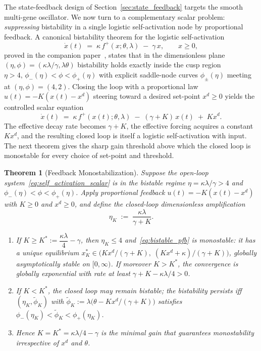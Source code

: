 \documentclass[12pt]{article}
\newtheorem{theorem}{Theorem}
\newcommand{\fplus}{f^{+}}
\begin{document}
The state-feedback design of Section~\ref{sec:state_feedback} targets
the smooth multi-gene oscillator. We now turn to a complementary
scalar problem: \emph{suppressing} bistability in a single logistic
self-activation node by proportional feedback. A canonical bistability
theorem for the logistic self-activation
\begin{equation}
\dot x(t) \;=\; \kappa\,\fplus(x;\theta,\lambda) \;-\; \gamma\,x,
\qquad x\ge 0,
\label{eq:self_activation_scalar}
\end{equation}
proved in the companion paper~\cite{belgacem2026extensions}, states
that in the dimensionless plane
$(\eta,\phi)=(\kappa\lambda/\gamma,\lambda\theta)$ bistability holds
exactly inside the cusp region $\eta>4,\,\phi_{-}(\eta)<\phi<\phi_{+}(\eta)$
with explicit saddle-node curves $\phi_{\pm}(\eta)$ meeting at
$(\eta,\phi)=(4,2)$. Closing the loop with a proportional law
$u(t)=-K(x(t)-x^{d})$ steering toward a desired set-point $x^{d}\ge 0$
yields the controlled scalar equation
\begin{equation}
\dot x(t) \;=\; \kappa\,\fplus(x(t);\theta,\lambda)
              \;-\;(\gamma+K)\,x(t)\;+\;K x^{d}.
\label{eq:bistable_pfb}
\end{equation}
The effective decay rate becomes $\gamma+K$, the effective forcing
acquires a constant $Kx^{d}$, and the resulting closed loop is itself
a logistic self-activation with input. The next theorem gives the
sharp gain threshold above which the closed loop is monostable for
every choice of set-point and threshold.

\begin{theorem}[Feedback Monostabilization]
\label{thm:monostab}
Suppose the open-loop system~\eqref{eq:self_activation_scalar} is in the
bistable regime $\eta=\kappa\lambda/\gamma>4$ and
$\phi_{-}(\eta)<\phi<\phi_{+}(\eta)$. Apply proportional feedback
$u(t)=-K(x(t)-x^{d})$ with $K\ge 0$ and $x^{d}\ge 0$, and define the
closed-loop dimensionless amplification
\[
\eta_K \;:=\; \frac{\kappa\lambda}{\gamma+K}.
\]
\begin{enumerate}
\item[\textup{(i)}] If $K\ge K^{*}:=\dfrac{\kappa\lambda}{4}-\gamma$,
      then $\eta_K\le 4$ and~\eqref{eq:bistable_pfb} is
      \emph{monostable}: it has a unique equilibrium
      $x_K^{*}\in\bigl(Kx^{d}/(\gamma+K),\;(Kx^{d}+\kappa)/(\gamma+K)\bigr)$,
      globally asymptotically stable on $[0,\infty)$. If moreover
      $K>K^{*}$, the convergence is globally exponential with rate
      at least $\gamma+K-\kappa\lambda/4>0$.
\item[\textup{(ii)}] If $K<K^{*}$, the closed loop may remain
      bistable; the bistability persists iff
      $(\eta_K,\tilde\phi_{K})$ with
      $\tilde\phi_{K}:=\lambda\bigl(\theta-Kx^{d}/(\gamma+K)\bigr)$
      satisfies
      $\phi_{-}(\eta_K)<\tilde\phi_{K}<\phi_{+}(\eta_K)$.
\item[\textup{(iii)}] Hence $K=K^{*}=\kappa\lambda/4-\gamma$ is the
      \emph{minimal} gain that guarantees monostability irrespective
      of $x^{d}$ and $\theta$.
\end{enumerate}
\end{theorem}
\end{document}

